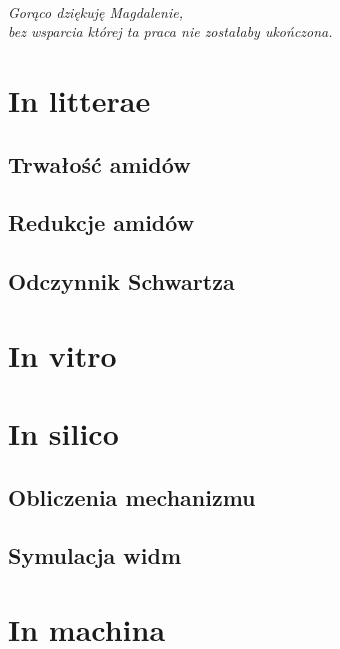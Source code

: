 \documentclass[a4paper, justified]{tufte-book}
\begin{document}
\frontmatter
\maketitle

\cleardoublepage
\thispagestyle{empty}
~\vfill
\vfill
\begin{fullwidth}
\begin{doublespace}
\raggedleft\noindent\fontsize{16}{20}\selectfont\itshape
\nohyphenation
Gorąco dziękuję Magdalenie,\\
bez wsparcia której ta praca nie zostałaby ukończona.
\end{doublespace}
\end{fullwidth}
\vfill

\tableofcontents



\mainmatter
\chapter{In litterae}
\section{Trwałość amidów}
\section{Redukcje amidów}
\section{Odczynnik Schwartza}

\chapter{In vitro}

\chapter{In silico}
\section{Obliczenia mechanizmu}
\section{Symulacja widm}

\chapter{In machina}
\end{document}
